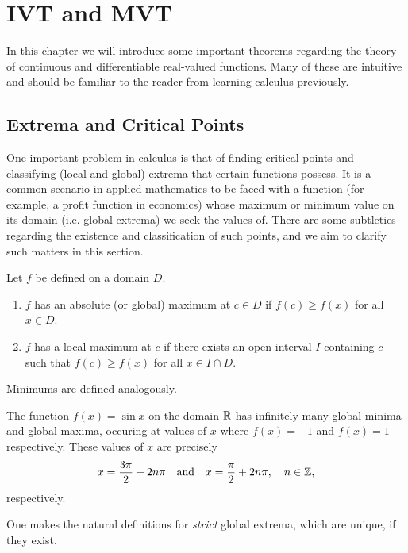 \documentclass[../calculus.tex]{subfiles}
\begin{document}
\chapter{IVT and MVT}

In this chapter we will introduce some important theorems regarding the theory of continuous and differentiable real-valued functions. Many of these are intuitive and should be familiar to the reader from learning calculus previously.

\section{Extrema and Critical Points}

One important problem in calculus is that of finding critical points and classifying (local and global) extrema that certain functions possess. It is a common scenario in applied mathematics to be faced with a function (for example, a profit function in economics) whose maximum or minimum value on its domain (i.e. global extrema) we seek the values of. There are some subtleties regarding the existence and classification of such points, and we aim to clarify such matters in this section.

\begin{definition}
    \begin{shaded*}
        Let $f$ be defined on a domain $D$.
        \begin{enumerate}
            \item $f$ has an absolute (or global) maximum at $c \in D$ if $f(c) \ge f(x)$ for all $x \in D$.
            \item $f$ has a local maximum at $c$ if there exists an open interval $I$ containing $c$ such that $f(c) \ge f(x)$ for all $x \in I \cap D$.
        \end{enumerate}
        Minimums are defined analogously.
    \end{shaded*}
\end{definition}
\begin{example}
    The function $f(x)=\sin x$ on the domain $\mathbb{R}$ has infinitely many global minima and global maxima, occuring at values of $x$ where $f(x)=-1$ and $f(x)=1$ respectively. These values of $x$ are precisely \[x=\frac{3\pi}{2}+2n\pi\quad\text{and}\quad x=\frac{\pi}{2}+2n\pi,\quad n\in\mathbb{Z},\]
    respectively.
\end{example}
One makes the natural definitions for \textit{strict} global extrema, which are unique, if they exist.
\end{document}
